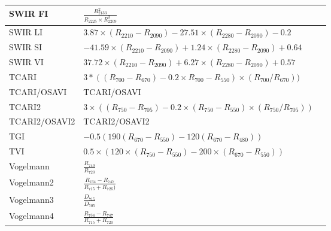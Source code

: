 \documentclass[letterpaper, peerreview, draftcls]{IEEEtran}
\begin{document}
\begin{xtabular*}{0.3\textwidth}{lll}
	SWIR FI        & $\frac{R_{2133}^2}{R_{2225} \times R_{2209}^3}$                                                      & \cite{levin2007} \\
	\midrule
	SWIR LI        & \parbox{3.8cm}{$3.87  \times (R_{2210} - R_{2090}) - 27.51 \times (R_{2280} - R_{2090}) - 0.2$}      & \cite{lobell2001} \\
	\midrule
	SWIR SI        & \parbox{3.8cm}{$-41.59 \times (R_{2210} - R_{2090}) + 1.24 \times (R_{2280} - R_{2090}) + 0.64 $}    & \cite{lobell2001} \\
	\midrule
	SWIR VI        & \parbox{3.8cm}{$37.72  \times (R_{2210} - R_{2090}) + 6.27 \times (R_{2280} - R_{2090}) + 0.57$}     & \cite{lobell2001} \\
	\midrule
	TCARI          & \parbox{3.8cm}{$3*((R_{700}-R_{670})-0.2\times R_{700}-R_{550})\times (R_{700}/R_{670}))$}           & \cite{haboudane2002} \\
	\midrule
	TCARI/OSAVI    & TCARI/OSAVI                                                                                          & \cite{haboudane2002} \\
	\midrule
	TCARI2         & \parbox{3.8cm}{$3 \times ((R_{750}-R_{705})-0.2 \times (R_{750}-R_{550}) \times (R_{750}/R_{705}))$} & \cite{wu2008a} \\
	\midrule
	TCARI2/OSAVI2  & TCARI2/OSAVI2                                                                                        & \cite{wu2008a} \\
	\midrule
	TGI            & \parbox{3.8cm}{$-0.5 (190 (R_{670} - R_{550} ) - 120 (R_{670} - R_{480}))$}                          & \cite{hunt2013} \\
	\midrule
	TVI            &\parbox{3.8cm}{$0.5\times (120 \times (R_{750}-R_{550})-200 \times (R_{670}-R_{550}))$}               & \cite{broge2001} \\
	\midrule
	Vogelmann      & $\frac{R_{740}}{R_{720}}$                                                                            & \cite{vogelmann1993} \\
	Vogelmann2     & $\frac{R_{734}-R_{747}}{R_{715}+R_{726})}$                                                           & \cite{vogelmann1993} \\
	Vogelmann3     & $\frac{D_{715}}{D_{705}}$                                                                            & \cite{vogelmann1993} \\
	Vogelmann4     & $\frac{R_{734}-R_{747}}{R_{715}+R_{720}}$                                                            & \cite{vogelmann1993} \\
\end{xtabular*}
\label{tab:vegindices}
\endgroup
\end{document}
